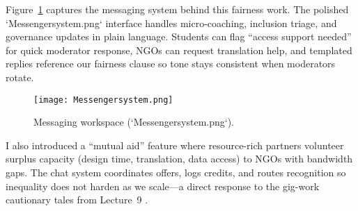 Figure~\ref{fig:chat-system} captures the messaging system behind this fairness work. The polished `Messengersystem.png` interface handles micro-coaching, inclusion triage, and governance updates in plain language. Students can flag ``access support needed'' for quick moderator response, NGOs can request translation help, and templated replies reference our fairness clause so tone stays consistent when moderators rotate.

\begin{figure}[H]
  \centering
  \texttt{[image: Messengersystem.png]}
  \caption{Messaging workspace (`Messengersystem.png`).}
  \label{fig:chat-system}
\end{figure}

I also introduced a ``mutual aid'' feature where resource-rich partners volunteer surplus capacity (design time, translation, data access) to NGOs with bandwidth gaps. The chat system coordinates offers, logs credits, and routes recognition so inequality does not harden as we scale---a direct response to the gig-work cautionary tales from Lecture~9 \citep{Lecture09}.
